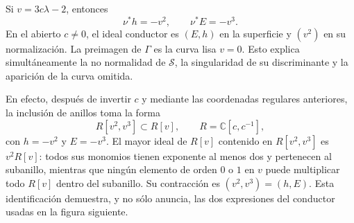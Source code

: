 \documentclass[11pt]{article}
\theoremstyle{definition}
\theoremstyle{remark}
\newcommand{\C}{\mathbb{C}}
\begin{document}
Si $v=3c\lambda-2$, entonces
\begin{equation}\label{eq:cusp-pullback}
\nu^*h=-v^2,\qquad \nu^*E=-v^3.
\end{equation}
En el abierto $c\neq0$, el ideal conductor es $(E,h)$ en la superficie y
$(v^2)$ en su normalizaci\'on. La preimagen de $\Gamma$ es la curva lisa
$v=0$. Esto explica simult\'aneamente la no normalidad de $\mathcal S$, la
singularidad de su discriminante y la aparici\'on de la curva omitida.

En efecto, despu\'es de invertir $c$ y mediante las coordenadas regulares
anteriores, la inclusi\'on de anillos toma la forma
\[
R[v^2,v^3]\subset R[v],\qquad R=\C[c,c^{-1}],
\]
con $h=-v^2$ y $E=-v^3$. El mayor ideal de $R[v]$ contenido en
$R[v^2,v^3]$ es $v^2R[v]$: todos sus monomios tienen exponente al menos dos y
pertenecen al subanillo, mientras que ning\'un elemento de orden $0$ o $1$ en
$v$ puede multiplicar todo $R[v]$ dentro del subanillo. Su contracci\'on es
$(v^2,v^3)=(h,E)$. Esta identificaci\'on demuestra, y no s\'olo anuncia, las
dos expresiones del conductor usadas en la figura siguiente.
\end{document}
